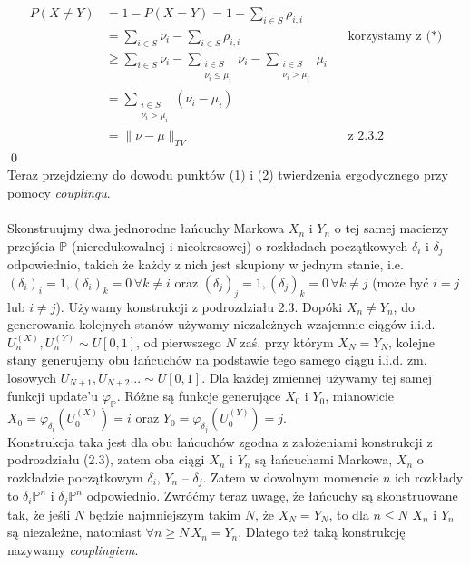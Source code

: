 \documentclass[a4paper]{article}
\begin{document}
\begin{align*}
P(X \neq Y) &= 1 - P(X = Y) = 1 - \sum\limits_{i \in S} \rho_{i, i} \\
&= \sum\limits_{i \in S} \nu_i - \sum\limits_{i \in S} \rho_{i, i}  && \text{korzystamy z (*)}\\
&\geq \sum\limits_{i \in S} \nu_i - \sum\limits_{\substack{i \in S\\ \nu_i \leq \mu_i}} \nu_i - \sum\limits_{\substack{i \in S\\ \nu_i > \mu_i}} \mu_i \\
&= \sum\limits_{\substack{i \in S\\ \nu_i > \mu_i}} (\nu_i - \mu_i) \\
&= \|\nu - \mu\|_{TV} && \text{z 2.3.2}
\end{align*}
\qed
\\
Teraz przejdziemy do dowodu punktów (1) i (2) twierdzenia ergodycznego przy pomocy \textit{couplingu}.
\\\\
Skonstruujmy dwa jednorodne łańcuchy Markowa $X_n$ i $Y_n$ o tej samej macierzy przejścia $\mathbb{P}$ (nieredukowalnej i nieokresowej) o rozkładach początkowych $\delta_i$ i $\delta_j$ odpowiednio, takich że każdy z nich jest skupiony w jednym stanie, i.e. $(\delta_i)_i = 1, (\delta_i)_k = 0 \, \forall k \neq i$ oraz $(\delta_j)_j = 1, (\delta_j)_k = 0 \, \forall k \neq j$ (może być $i=j$ lub $i\neq j$). Używamy konstrukcji z podrozdziału 2.3. Dopóki $X_n \neq Y_n$, do generowania kolejnych stanów używamy niezależnych wzajemnie ciągów i.i.d. $U_n^{(X)}, U_n^{(Y)} \sim U[0,1]$, od pierwszego $N$ zaś, przy którym $X_N = Y_N$, kolejne stany generujemy obu łańcuchów na podstawie tego samego ciągu i.i.d. zm. losowych $U_{N+1}, U_{N+2} ... \sim U[0,1]$. Dla każdej zmiennej używamy tej samej funkcji update'u $\varphi_{\mathbb{P}}$. Różne są funkcje generujące $X_0$ i $Y_0$, mianowicie $X_0 = \varphi_{\delta_i}(U_0^{(X)}) = i$ oraz $Y_0 = \varphi_{\delta_j}(U_0^{(Y)}) = j$.\\
Konstrukcja taka jest dla obu łańcuchów zgodna z założeniami konstrukcji z podrozdziału (2.3), zatem oba ciągi $X_n$ i $Y_n$ są łańcuchami Markowa, $X_n$ o rozkładzie początkowym $\delta_i$, $Y_n$ – $\delta_j$. Zatem w dowolnym momencie $n$ ich rozkłady to $\delta_i\mathbb{P}^n$ i $\delta_j\mathbb{P}^n$ odpowiednio. Zwróćmy teraz uwagę, że łańcuchy są skonstruowane tak, że jeśli $N$ będzie najmniejszym takim $N$, że $X_N = Y_N$, to dla $n \leq N$ $X_n$ i $Y_n$ są niezależne, natomiast $\forall n \geq N \, X_n = Y_n$. Dlatego też taką konstrukcję nazywamy \textit{couplingiem}.\\
\end{document}
